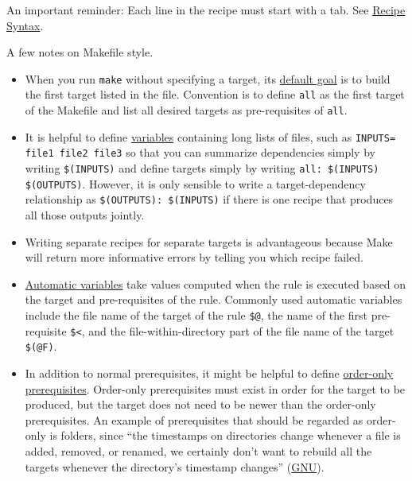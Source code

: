 An important reminder: Each line in the recipe must start with a tab.
See \href{https://www.gnu.org/software/make/manual/html_node/Recipe-Syntax.html}{Recipe Syntax}.

A few notes on Makefile style.
\begin{itemize}
\item
When you run \texttt{make} without specifying a target,
its \href{https://www.gnu.org/software/make/manual/html_node/How-Make-Works.html#How-Make-Works}{default goal}
is to build the first target listed in the file.
Convention is to define \texttt{all} as the first target of the Makefile and list all desired targets as pre-requisites of \texttt{all}. 
\item It is helpful to define \href{https://www.gnu.org/software/make/manual/html_node/Variables-Simplify.html#Variables-Simplify}{variables} containing long lists of files, such as \texttt{INPUTS= file1 file2 file3}
so that you can summarize dependencies simply by writing \texttt{\$(INPUTS)}
and define targets simply by writing \texttt{all: \$(INPUTS) \$(OUTPUTS)}.
However, it is only sensible to write a target-dependency relationship as
\texttt{\$(OUTPUTS): \$(INPUTS)}
if there is one recipe that produces all those outputs jointly.
\item Writing separate recipes for separate targets is advantageous because Make will return more informative errors by telling you which recipe failed.
\item \href{https://www.gnu.org/software/make/manual/html_node/Automatic-Variables.html}{Automatic variables} take values computed when the rule is executed based on the target and pre-requisites of the rule.
Commonly used automatic variables include
the file name of the target of the rule \texttt{\$@},
the name of the first pre-requisite \texttt{\$<},
and
the file-within-directory part of the file name of the target \texttt{\$(@F)}.
\item In addition to normal prerequisites, it might be helpful to define \href{https://www.gnu.org/software/make/manual/html_node/Prerequisite-Types.html}{order-only prerequisites}.
Order-only prerequisites must exist in order for the target to be produced, but the target does not need to be newer than the order-only prerequisites.
An example of prerequisites that should be regarded as order-only is folders, since ``the timestamps on directories change whenever a file is added, removed, or renamed, we certainly don’t want to rebuild all the targets whenever the directory’s timestamp changes'' (\href{https://www.gnu.org/software/make/manual/html_node/Prerequisite-Types.html}{GNU}). 

\end{itemize}
